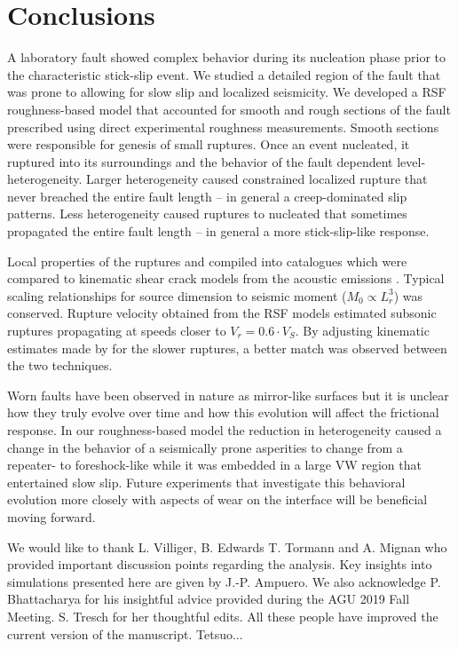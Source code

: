 \documentclass[final,3p, 11pt,authoryear]{elsarticle}
\begin{document}
\section{Conclusions}

A laboratory fault showed complex behavior during its nucleation phase prior to the characteristic stick-slip event.  We studied a detailed region of the fault that was prone to allowing for slow slip and localized seismicity.  We developed a RSF roughness-based model that accounted for smooth and rough sections of the fault prescribed using direct experimental roughness measurements. Smooth sections were responsible for genesis of small ruptures.  Once an event nucleated, it ruptured into its surroundings and the behavior of the fault dependent level-heterogeneity.  Larger heterogeneity caused constrained localized rupture that never breached the entire fault length -- in general a creep-dominated slip patterns. Less heterogeneity caused ruptures to nucleated that sometimes propagated the entire fault length -- in general a more stick-slip-like response.  

Local properties of the ruptures and compiled into catalogues which were compared to kinematic shear crack models from the acoustic emissions \citep{Selvadurai2019}.  Typical scaling relationships for source dimension to seismic moment ($M_{0} \propto L^{3}_{r}$) was conserved.  Rupture velocity obtained from the RSF models estimated subsonic ruptures propagating at speeds closer to $V_r = 0.6\cdot V_{S}$.  By adjusting kinematic estimates made by \citet{Selvadurai2019} for the slower ruptures, a better match was observed between the two techniques.

Worn faults have been observed in nature as mirror-like surfaces but it is unclear how they truly evolve over time and how this evolution will affect the frictional response.  In our roughness-based model the reduction in heterogeneity caused a change in the behavior of a seismically prone asperities to change from a repeater- to foreshock-like while it was embedded in a large VW region that entertained slow slip.  Future experiments that investigate this behavioral evolution more closely with aspects of wear on the interface will be beneficial moving forward. 

\acknowledgments
We would like to thank L. Villiger, B. Edwards T. Tormann and A. Mignan who provided important discussion points regarding the analysis. Key insights into simulations presented here are given by J.-P. Ampuero. We also acknowledge P. Bhattacharya for his insightful advice provided during the AGU 2019 Fall Meeting.  S. Tresch for her thoughtful edits. All these people have improved the current version of the manuscript. Tetsuo...
\end{document}
